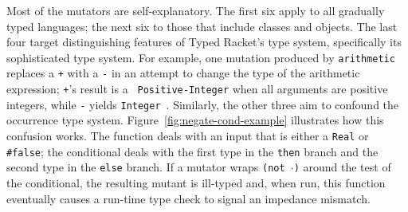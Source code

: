 Most of the mutators are self-explanatory.  The first six apply to all
gradually typed languages; the next six to those that include classes and
objects. The last four target distinguishing features of Typed Racket's type
system, specifically its sophisticated type system. For example, one mutation
produced by {\tt arithmetic} replaces a {\tt +} with a {\tt -} in an attempt to
change the type of the arithmetic expression; {\tt +}'s result is a {\tt
Positive-Integer} when all arguments are positive integers, while {\tt -}
yields {\tt Integer}~\citep{stathff-padl-12}. Similarly, the other three aim to
confound the occurrence type system. Figure~\ref{fig:negate-cond-example}
illustrates how this confusion works. The function deals with an input that is
either a {\tt Real} or {\tt \#false}; the conditional deals with the first type
in the {\tt then} branch and the second type in the {\tt else} branch.  If a
mutator wraps {\tt (not $\cdot$)} around the test of the conditional, the
resulting mutant is ill-typed and, when run, this function eventually
causes a run-time type check to signal an impedance mismatch.

